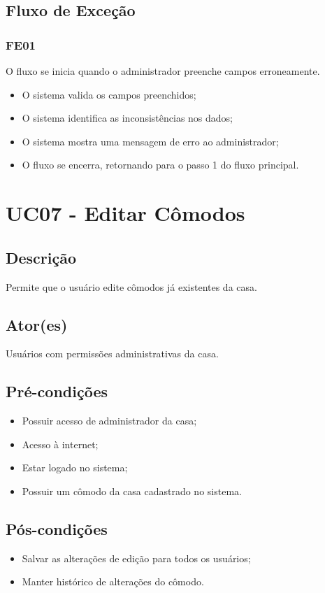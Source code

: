 \begin{anexosenv}
    \subsection{Fluxo de Exceção}
        \subsubsection{FE01}
            O fluxo se inicia quando o administrador preenche campos erroneamente.
            \begin{itemize}
                \item O sistema valida os campos preenchidos;
                \item O sistema identifica as inconsistências nos dados;
                \item O sistema mostra uma mensagem de erro ao administrador;
                \item O fluxo se encerra, retornando para o passo 1 do fluxo principal.
            \end{itemize}

\section{UC07 \-- Editar Cômodos}
    \subsection{Descrição}
        Permite que o usuário edite cômodos já existentes da casa.
    \subsection{Ator(es)}
        Usuários com permissões administrativas da casa.
    \subsection{Pré-condições}
        \begin{itemize}
            \item Possuir acesso de administrador da casa;
            \item Acesso à internet;
            \item Estar logado no sistema;
            \item Possuir um cômodo da casa cadastrado no sistema.
        \end{itemize}
    \subsection{Pós-condições}
        \begin{itemize}
            \item Salvar as alterações de edição para todos os usuários;
            \item Manter histórico de alterações do cômodo.
        \end{itemize}

\end{anexosenv}
